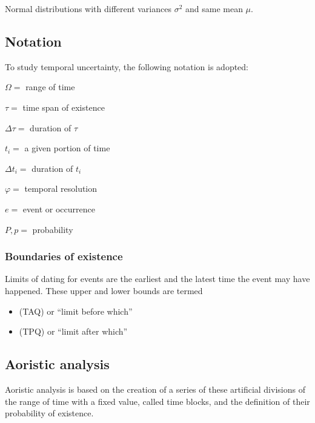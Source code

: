 \documentclass[a4paper,12pt,english]{sphinxhowto}
\begin{document}
Normal distributions with different variances \(\sigma^2\) and same mean \(\mu\).



\subsection{Notation}
\label{\detokenize{Uncertainty:notation}}
To study temporal uncertainty, the following notation is adopted:


\(\varOmega =\) range of time

\(\tau =\) time span of existence

\(\Delta \tau =\) duration of \(\tau\)

\(t_i =\) a given portion of time

\(\Delta t_i =\) duration of \(t_i\)

\(\varphi =\) temporal resolution

\(e =\) event or occurrence

\(P, p =\) probability





\subsubsection{Boundaries of existence}
\label{\detokenize{Uncertainty:boundaries-of-existence}}\label{\detokenize{Uncertainty:tapq}}
Limits of dating for events are the earliest and the latest time the event may have happened.
These upper and lower bounds are termed
\begin{itemize}
\item {} 
 (TAQ) or “limit before which”

\item {} 
 (TPQ) or “limit after which”

\end{itemize}



\subsection{Aoristic analysis}
\label{\detokenize{Uncertainty:aoristic-analysis}}\label{\detokenize{Uncertainty:aora}}
Aoristic analysis is based on the creation of a series of these artificial divisions of
the range of time with a fixed value, called time blocks, and the definition of their probability of existence.
\end{document}
